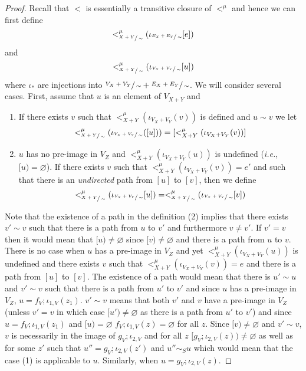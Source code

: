 \begin{proof}

Recall that $<$ is essentially a transitive closure of $<^{\mu}$ and hence we can first define 
    \[<_{\sfrac{X+Y}{\sim}}^{\mu}(\iota_{\sfrac{E_{X} + E_{Y}}{\sim}}[e])
    \] and 
    \[
        <_{\sfrac{X+Y}{\sim}}^{\mu}(\iota_{\sfrac{V_{X} + V_{Y}}{\sim}}[u])
    \] where $\iota_*$ are injections into $\sfrac{V_{X} + V_{Y}}{\sim} + \sfrac{E_{X} + E_{Y}}{\sim}$.
    We will consider several cases.
    First, assume that $u$ is an element of $V_{X+Y}$ and
    \begin{enumerate}
        \item If there exists $v$ such that $<_{X+Y}^{\mu}(\iota_{V_{X} + V_{Y}}(v))$ is defined and $u \sim v$
              we let
              \[
                <_{\sfrac{X+Y}{\sim}}^{\mu}(\iota_{\sfrac{V_{X} + V_{Y}}{\sim}}([u])) = [<_{X+Y}^{\mu}(\iota_{V_{X} + V_{Y}}(v))]
              \]
        \item \label{def:child_respects_connectivity} $u$ has no pre-image in $V_{Z}$ and $<_{X+Y}^{\mu}(\iota_{V_{X} + V_{Y}}(u))$ is undefined (\textit{i.e.}, $[u) = \varnothing$).
              If there exists $v$ such that $<_{X+Y}^{\mu}(\iota_{V_{X} + V_{Y}}(v)) = e'$ and such that there is an \textit{undirected} path from $[u]$ to $[v]$, then we define
              \[ 
                <_{\sfrac{X+Y}{\sim}}^{\mu}(\iota_{\sfrac{V_{X} + V_{Y}}{\sim}}[u]) = <_{\sfrac{X+Y}{\sim}}^{\mu}(\iota_{\sfrac{V_{X} + V_{Y}}{\sim}}[v])
              \]
    \end{enumerate}
    Note that the existence of a path in the definition (2) implies that there exists $v' \sim v$ such that there is a path from $u$ to $v'$ and furthermore $v \not = v'$.
    If $v' = v$ then it would mean that $[u) \not = \varnothing$ since $[v) \not = \varnothing$ and there is a path from $u$ to $v$.
    There is no case when $u$ has a pre-image in $V_{Z}$ and yet $<_{X+Y}^{\mu}(\iota_{V_{X} + V_{Y}}(u))$ is undefined and there exists $v$ such that $<_{X+Y}^{\mu}(\iota_{V_{X} + V_{Y}}(v)) = e$ and there is a path from $[u]$ to $[v]$.
    The existence of a path would mean that there is $u' \sim u$ and $v' \sim v$ such that there is a path from $u'$ to $v'$ and since $u$ has a pre-image in $V_{Z}$, $u = f_{V};\iota_{1,V}(z_1)$.
    $v' \sim v$ means that both $v'$ and $v$ have a pre-image in $V_{Z}$ (unless $v' = v$ in which case $[u') \not = \varnothing$ as there is a path from $u'$ to $v'$) and since $u = f_{V};\iota_{1,V}(z_1)$ and $[u) = \varnothing$ $f_{V};\iota_{1,V}(z) = \varnothing$ for all $z$.
    Since $[v) \not = \varnothing$ and $v' \sim v$, $v$ is necessarily in the image of $g_{V};\iota_{2,V}$ and for all $z$ $[g_{V};\iota_{2,V}(z)) \not = \varnothing$ as well as for some $z'$ such that $u'' = g_{V};\iota_{2,V}(z')$ and $u'' \sim_{S} u$ which would mean that the case (1) is applicable to $u$.
    Similarly, when $u = g_{V};\iota_{2,V}(z)$.
    

\end{proof}

